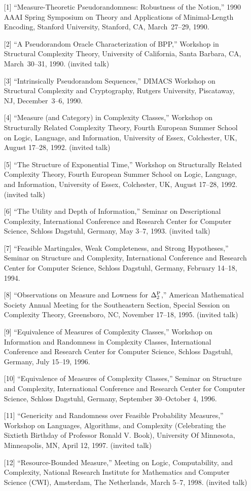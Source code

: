 \begin{enumerate}
\item[{[1]}] ``Measure-Theoretic Pseudorandomness:  Robustness of the
Notion,'' 1990 AAAI Spring Symposium on Theory and Applications of
Minimal-Length Encoding, Stanford University, Stanford, CA,
March~27--29, 1990.
\item[{[2]}] ``A Pseudorandom Oracle Characterization of BPP,'' Workshop
in Structural Complexity Theory, University of California, Santa
Barbara, CA, March~30--31, 1990. (invited talk)
\item[{[3]}] ``Intrinsically Pseudorandom Sequences,'' DIMACS 
Workshop on Structural Complexity and Cryptography, Rutgers
University, Piscataway, NJ, December~3--6, 1990.
\item[{[4]}] ``Measure (and Category) in Complexity Classes,'' Workshop on 
Structurally Related Complexity Theory, Fourth European Summer School
on Logic, Language, and Information, University of Essex, Colchester, UK,
August 17--28, 1992. (invited talk)
\item[{[5]}] ``The Structure of Exponential Time,'' Workshop on 
Structurally Related Complexity Theory, Fourth European Summer School
on Logic, Language, and Information, University of Essex, Colchester, UK,
August 17--28, 1992. (invited talk)
\item[{[6]}] ``The Utility and Depth of Information,'' Seminar on
Descriptional Complexity, International Conference and Research Center
for Computer Science, Schloss Dagstuhl, Germany, May 3--7, 1993.
(invited talk)
\item[{[7]}] ``Feasible Martingales, Weak Completeness, and Strong
Hypotheses,''  Seminar on Structure and Complexity,
International Conference and Research Center for Computer Science, 
Schloss Dagstuhl, Germany, February 14--18, 1994.
\item[{[8]}] ``Observations on Measure and Lowness for
$\Delta^{\rm P}_{2}$,'' American Mathematical Society Annual
Meeting for the Southeastern Section, Special Session on
Complexity Theory, Greensboro, NC, November 17--18, 1995.
(invited talk)
\item[{[9]}] ``Equivalence of Measures of Complexity Classes,''
Workshop on Information and Randomness in Complexity Classes,
International Conference and Research Center for Computer
Science, Schloss Dagstuhl, Germany, July 15--19, 1996.
\item[{[10]}] ``Equivalence of Measures of Complexity Classes,''
Seminar on Structure and Complexity,
International Conference and Research Center for Computer
Science, Schloss Dagstuhl, Germany, September 30--October 4, 1996.
\item[{[11]}] ``Genericity and Randomness over Feasible Probability
Measures,'' Workshop on Languages, Algorithms, and Complexity 
(Celebrating the Sixtieth Birthday of Professor Ronald V. Book),
University Of Minnesota, Minneapolis, MN, April 12, 1997.
(invited talk)
\item[{[12]}] ``Resource-Bounded Measure,'' Meeting on Logic,
Computability, and Complexity, National Research Institute for 
Mathematics and Computer Science (CWI),
Amsterdam, The Netherlands, March 5--7, 1998. (invited talk)
\end{enumerate}

